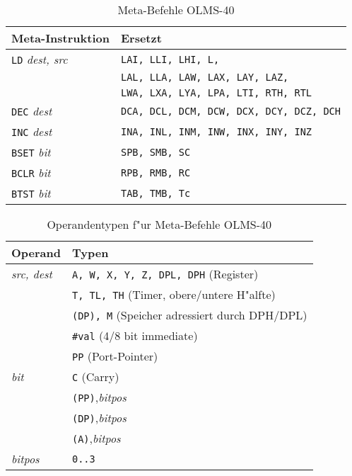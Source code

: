 \documentclass[12pt,a4paper,twoside]{report}
\newcommand{\tty}[1]{{\tt #1}}
\begin{document}
\begin{table*}
\begin{center}\begin{tabular}{|l|l|}
\hline
Meta-Instruktion          & Ersetzt \\
\hline
\tty{LD} {\em dest, src}        & \tty{LAI, LLI, LHI, L,} \\
                                & \tty{LAL, LLA, LAW, LAX, LAY, LAZ,} \\
                                & \tty{LWA, LXA, LYA, LPA, LTI, RTH, RTL} \\
\tty{DEC} {\em dest}            & \tty{DCA, DCL, DCM, DCW, DCX, DCY, DCZ, DCH} \\
\tty{INC} {\em dest}            & \tty{INA, INL, INM, INW, INX, INY, INZ} \\
\tty{BSET} {\em bit}            & \tty{SPB, SMB, SC} \\
\tty{BCLR} {\em bit}            & \tty{RPB, RMB, RC} \\
\tty{BTST} {\em bit}            & \tty{TAB, TMB, Tc} \\
\hline
\end{tabular}\end{center}
\caption{Meta-Befehle OLMS-40}
\label{TabOLMS40Meta}
\end{table*}

\begin{table*}
\begin{center}\begin{tabular}{|l|l|}
\hline
Operand                 & Typen \\
\hline
{\em src, dest}         & \tty{A, W, X, Y, Z, DPL, DPH} (Register) \\
                        & \tty{T, TL, TH} (Timer, obere/untere H"alfte) \\
                        & \tty{(DP), M} (Speicher adressiert durch DPH/DPL) \\
                        & \tty{\#val} (4/8 bit immediate) \\
                        & \tty{PP} (Port-Pointer) \\
{\em bit}               & \tty{C} (Carry) \\
                        & \tty{(PP)},{\em bitpos} \\
                        & \tty{(DP)},{\em bitpos} \\
                        & \tty{(A)},{\em bitpos} \\
{\em bitpos}            & \tty{0..3} \\
\hline
\end{tabular}\end{center}
\caption{Operandentypen f"ur Meta-Befehle OLMS-40}
\label{TabOLMS40MetaOps}
\end{table*}
\end{document}
